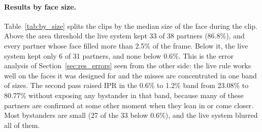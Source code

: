\paragraph{Results by face size.}
Table~\ref{tab:by_size} splits the clips by the median size of the face during the clip.
Above the area threshold the live system kept 33 of 38 partners (86.8\%), and every
partner whose face filled more than 2.5\% of the frame. Below it, the live system kept only
6 of 31 partners, and none below 0.6\%. This is the error analysis of
Section~\ref{sec:res_errors} seen from the other side: the live rule works well on the
faces it was designed for and the misses are concentrated in one band of sizes. The second
pass raised IPR in the 0.6\% to 1.2\% band from 23.08\% to 80.77\% without exposing any
bystander in that band, because many of these partners are confirmed at some other moment
when they lean in or come closer. Most bystanders are small (27 of the 33 below 0.6\%), and
the live system blurred all of them.

\begin{table}[htbp]
\begin{singlespace}
\centering
\caption{Set~C results by the median face area during the clip, as a share of the frame.
Counts are TP / FN / FP / TN.}
\label{tab:by_size}
\renewcommand{\arraystretch}{1.3}
\end{singlespace}
\end{table}

